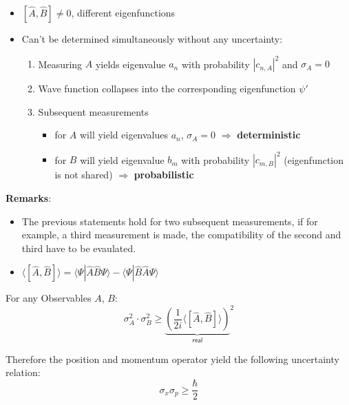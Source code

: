 \begin{itemize}
    \item $[\widehat{A}, \widehat{B}] \neq 0$, different eigenfunctions
    \item Can't be determined simultaneously without any uncertainty:
          \begin{enumerate}
              \item Measuring $A$ yields eigenvalue $a_n$ with probability $|c_{n,A}|^2$ and $\sigma_A=0$
              \item Wave function collapses into the corresponding eigenfunction $\psi'$
              \item Subsequent measurements
                    \begin{itemize}
                        \item for $A$ will yield eigenvalues $a_n$, $\sigma_A=0$ $\Rightarrow$ \textbf{deterministic}
                        \item for $B$ will yield eigenvalue $b_m$ with probability $|c_{m,B}|^2$ (eigenfunction is not shared) $\Rightarrow$ \textbf{probabilistic}
                    \end{itemize}
          \end{enumerate}
\end{itemize}

\textbf{Remarks}:
\begin{itemize}
    \item The previous statements hold for two subsequent measurements, if for example, a third measurement is made, the compatibility of the second and third have to be evaulated.
    \item $\langle[\hat{A},\hat{B}]\rangle=\langle\Psi|\hat{A}\hat{B}\Psi\rangle-\langle\Psi|\hat{B}\hat{A}\Psi\rangle$
\end{itemize}

\newpar{}

For any Observables $A$, $B$:
\begin{equation*}
    \sigma_A^2\cdot\sigma_B^2\geqslant{\underbrace{\left(\frac1{2i}\langle[\hat{A},\hat{B}]\rangle\right)}_{\textsf{real}}}^2
\end{equation*}

Therefore the position and momentum operator yield the following uncertainty relation:
\begin{equation*}
    \sigma_x\sigma_p \geq \frac{\hbar}{2}
\end{equation*}

